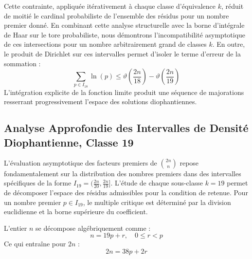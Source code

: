 \documentclass[12pt,a4paper]{article}
\begin{document}
    Cette contrainte, appliquée itérativement à chaque classe d'équivalence $k$, réduit de moitié le cardinal probabiliste de l'ensemble des résidus pour un nombre premier donné.
    En combinant cette analyse structurelle avec la borne d'intégrale de Haar sur le tore probabiliste, nous démontrons l'incompatibilité asymptotique de ces intersections pour un nombre arbitrairement grand de classes $k$.
    En outre, le produit de Dirichlet sur ces intervalles permet d'isoler le terme d'erreur de la sommation :
    \begin{equation}
    \sum_{p \in I_18} \ln(p) \le \vartheta\left(\frac{2n}{18}\right) - \vartheta\left(\frac{2n}{19}\right)
    \end{equation}
    L'intégration explicite de la fonction limite produit une séquence de majorations resserrant progressivement l'espace des solutions diophantiennes.
    
    \newpage
    \subsection{Analyse Approfondie des Intervalles de Densité Diophantienne, Classe 19}
    L'évaluation asymptotique des facteurs premiers de $\binom{2n}{n}$ repose fondamentalement sur la distribution des nombres premiers dans des intervalles spécifiques de la forme $I_19 = (\frac{2n}{20}, \frac{2n}{19}]$.
    L'étude de chaque sous-classe $k = 19$ permet de décomposer l'espace des résidus admissibles pour la condition de retenue.
    Pour un nombre premier $p \in I_19$, le multiple critique est déterminé par la division euclidienne et la borne supérieure du coefficient.

    L'entier $n$ se décompose algébriquement comme :
    \begin{equation}
    n = 19 p + r, \quad 0 \le r < p
    \end{equation}
    Ce qui entraîne pour $2n$ :
    \begin{equation}
    2n = 38 p + 2r
    \end{equation}
\end{document}
